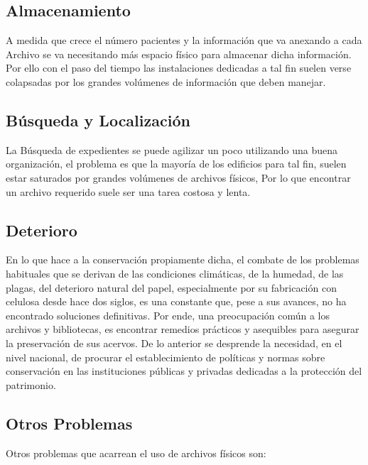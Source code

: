 \subsection{Almacenamiento}
 A medida que crece el número pacientes y la información que va anexando a cada Archivo se va necesitando más espacio físico para almacenar dicha información. Por ello con el paso del tiempo las instalaciones dedicadas a tal fin suelen verse colapsadas por los grandes volúmenes de información que deben manejar.\\[0.1cm]

\subsection{Búsqueda y Localización}
La Búsqueda de expedientes se puede agilizar un poco utilizando una buena organización, el problema es que la mayoría de los edificios para tal fin, suelen estar saturados por grandes volúmenes de archivos físicos, Por lo que encontrar un archivo requerido suele ser una tarea costosa y lenta.\\[0.1cm]

\subsection{Deterioro}
En lo que hace a la conservación propiamente dicha, el combate de los problemas habituales que se derivan de las condiciones climáticas, de la humedad, de las plagas, del deterioro natural del papel, especialmente por su fabricación con celulosa desde hace dos siglos, es una constante que, pese a sus avances, no ha encontrado soluciones definitivas. Por ende, una preocupación común a los archivos y bibliotecas, es encontrar remedios prácticos y asequibles para asegurar la preservación de sus acervos. De lo anterior se desprende la necesidad, en el nivel nacional, de procurar el establecimiento de políticas y normas sobre conservación en las instituciones públicas y privadas dedicadas a la protección del patrimonio.\\[0.1cm]

\subsection{Otros Problemas}
Otros problemas que acarrean el uso de archivos físicos son:

